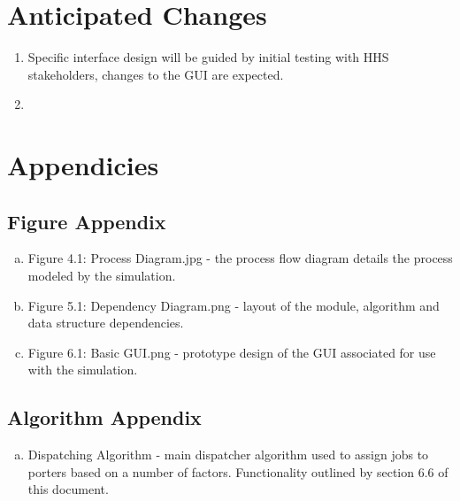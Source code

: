 \documentclass[paper=letter, fontsize=10pt]{scrartcl}
\numberwithin{equation}{section}		%
\numberwithin{figure}{section}			%
\numberwithin{table}{section}				%
\begin{document}
\section{Anticipated Changes}
\begin{enumerate}[1]
	\item Specific interface design will be guided by initial testing with HHS stakeholders, changes to the GUI are expected.
	\item
\end{enumerate}

\section{Appendicies}
\subsection{Figure Appendix}
\begin{enumerate}[(a)]
	\item Figure 4.1: Process Diagram.jpg - the process flow diagram details the process modeled by the simulation.
	\item Figure 5.1: Dependency Diagram.png - layout of the module, algorithm and data structure dependencies.
	\item Figure 6.1: Basic GUI.png - prototype design of the GUI associated for use with the simulation.
\end{enumerate}
\subsection{Algorithm Appendix}
\begin{enumerate}[(a)]
	\item Dispatching Algorithm - main dispatcher algorithm used to assign jobs to porters based on a number of factors. Functionality outlined by section 6.6 of this document.
\end{enumerate}

\end{document}
